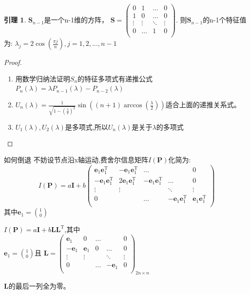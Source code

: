 \documentclass[notheorems,xetex]{beamer}
\theoremstyle{definition}
\newtheorem{lemma}{引理}
\begin{document}
\begin{frame}[noframenumbering]
\begin{lemma}\label{lemma:special}
$\bm{S}_{n-1}$是一个n-1维的方阵，
$\bm{S}=\left(
\begin{array}{cccc}
0&1&\dots&0\\
1&0&\dots&0\\
\vdots&\vdots&\ddots&\vdots\\
0&\dots&1&0\\
\end{array}\right).$
则$\bm{S}_{n-1}$的n-1个特征值为:
$\lambda_j=2\cos(\frac{\pi j}{n}),j=1,2,...,n-1$
\end{lemma}
\begin{proof}
\begin{enumerate}
  \item 用数学归纳法证明$S_n$的特征多项式有递推公式$P_n(\lambda)=\lambda P_{n-1}(\lambda)-P_{n-2}(\lambda)$
  \item $U_n(\lambda)=\frac{1}{\sqrt{1-(\frac{\lambda}{2})^2}}\sin((n+1)\arccos(\frac{\lambda}{2}))$适合上面的递推关系式。
  \item $U_1(\lambda),U_2(\lambda)$是多项式,所以$U_n(\lambda)$是关于$\lambda$的多项式
\end{enumerate}
\end{proof}
\end{frame}
\begin{frame}[noframenumbering]{如何倒退}
不妨设节点沿x轴运动,费舍尔信息矩阵$I(\bm{P})$化简为:
\begin{equation*}
I(\bm{P})=a\bm{I}+b \left(
\begin{array}{ccccc}
\bm{e}_1\bm{e}_1^{\textrm{T}}&-\bm{e}_1\bm{e}_1^{\textrm{T}}&\dots&&0\\
-\bm{e}_1\bm{e}_1^{\textrm{T}}&2\bm{e}_1\bm{e}_1^{\textrm{T}}&-\bm{e}_1\bm{e}_1^{\textrm{T}}&\dots&0\\
\vdots &\vdots&&\ddots &\vdots\\
0&&\dots&-\bm{e}_1\bm{e}_1^{\textrm{T}}&\bm{e}_1\bm{e}_1^{\textrm{T}}\\
\end{array}
\right)
\end{equation*}
其中$\bm{e}_1=\binom{1}{0}$
\end{frame}
\begin{frame}[noframenumbering]
$I(\bm{P})=a\bm{I}+b \bm{L}\bm{L}^{\textrm{T}}$,其中\\

\bigskip
$\bm{e}_1=\binom{1}{0}$且
$\bm{L}=\left(\begin{array}{ccccc}
\bm{e}_1&0&\dots&&0\\
-\bm{e}_1&\bm{e}_1&0&\dots&0\\
\vdots &\vdots&&\ddots &\vdots\\
0&&\dots&-\bm{e}_1&0\\
\end{array}
\right)_{2n\times n}$
\bigskip

$\bm{L}$的最后一列全为零。
\end{frame}
\end{document}
